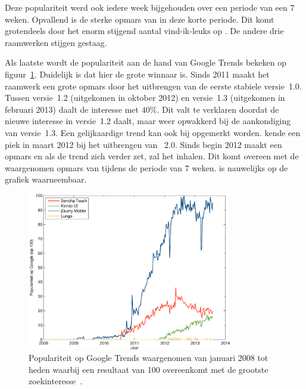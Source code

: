 Deze populariteit werd ook iedere week bijgehouden over een periode van een $7$ weken.
Opvallend is de sterke opmars van \kendo{} in deze korte periode.
Dit komt grotendeels door het enorm stijgend aantal vind-ik-leuks op \fb{}.
De andere drie raamwerken stijgen gestaag.


Als laatste wordt de populariteit aan de hand van Google Trends bekeken op figuur~\ref{fig:google-trends}.
Duidelijk is dat hier \jqm{} de grote winnaar is.
Sinds 2011 maakt het raamwerk een grote opmars door het uitbrengen van de eerste stabiele versie~1.0.
Tussen versie~1.2 (uitgekomen in oktober 2012) en versie~1.3 (uitgekomen in februari 2013) daalt de interesse met $40\%$.
Dit valt te verklaren doordat de nieuwe interesse in versie~1.2 daalt, maar weer opwakkerd bij de aankondiging van versie~1.3. 
Een gelijkaardige trend kan ook bij \st{} opgemerkt worden.
\st{} kende een piek in maart 2012 bij het uitbrengen van \st{}~2.0.
Sinds begin 2012 maakt \kendo{} een opmars en als de trend zich verder zet, zal het \st{} inhalen.
Dit komt overeen met de waargenomen opmars van \kendo{} tijdens de periode van $7$ weken.
\lungo{} is nauwelijks op de grafiek waarneembaar.

\begin{figure}
  \centering
  \includegraphics[width=0.8\textwidth]{figuren/google-trends.pdf}
  \caption{Populariteit op Google Trends waargenomen van januari 2008 tot heden waarbij een resultaat van 100 overeenkomt met de grootste zoekinteresse~\cite{Google2012a}.}
  \label{fig:google-trends}
\end{figure}